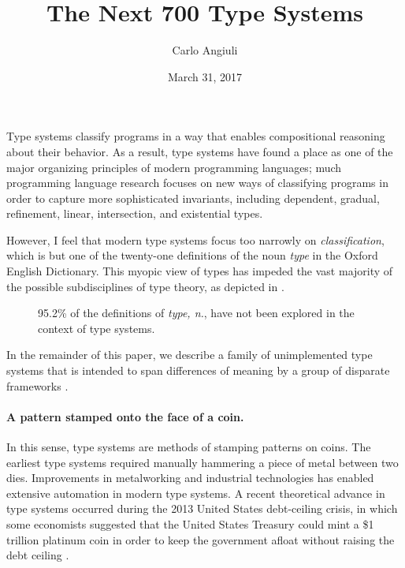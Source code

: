 \documentclass[10pt]{article}
\title{The Next 700 Type Systems}
\author{Carlo Angiuli}
\date{March 31, 2017}
\newcommand{\slice}[3]{
  \draw[thick,fill=#3] (0,0) -- (#1:1) arc (#1:#2:1) -- cycle;
}
\begin{document}
\maketitle

Type systems classify programs in a way that enables compositional reasoning
about their behavior. As a result, type systems have found a place as one of the
major organizing principles of modern programming languages; much programming
language research focuses on new ways of classifying programs in order to
capture more sophisticated invariants, including dependent, gradual, refinement,
linear, intersection, and existential types.

However, I feel that modern type systems focus too narrowly on
\emph{classification}, which is but one of the twenty-one definitions of the
noun \emph{type} in the Oxford English Dictionary. This myopic view of types has
impeded the vast majority of the possible subdisciplines of type theory, as
depicted in .

\begin{figure}[hb]
\centering
{}
\caption{95.2\% of the definitions of \emph{type, n.}, have not been explored in
the context of type systems.}
\label{fig:pie-chart}
\end{figure}

In the remainder of this paper, we describe a family of unimplemented type
systems that is intended to span differences of meaning by a group of disparate
frameworks \citep{landin66}.

\paragraph{A pattern stamped onto the face of a coin.}

In this sense, type systems are methods of stamping patterns on coins. The
earliest type systems required manually hammering a piece of metal between two
dies. Improvements in metalworking and industrial technologies has enabled
extensive automation in modern type systems. A recent theoretical advance in
type systems occurred during the 2013 United States debt-ceiling crisis, in
which some economists suggested that the United States Treasury could mint a \$1
trillion platinum coin in order to keep the government afloat without raising
the debt ceiling \citep{matthews13}.
\end{document}

